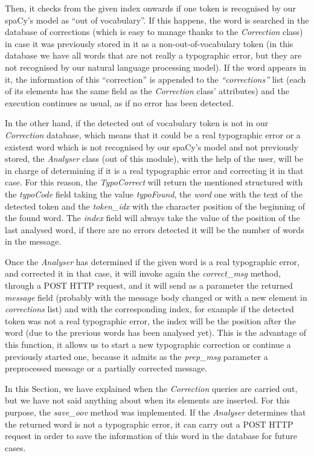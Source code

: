 Then, it checks from the given index onwards if one token is recognised by our spaCy's model as ``out of vocabulary''. If this happens, the word is searched in the database of corrections (which is easy to manage thanks to the \textit{Correction} class) in case it was previously stored in it as a non-out-of-vocabulary token (in this database we have all words that are not really a typographic error, but they are not recognised by our natural language processing model). If the word appears in it, the information of this ``correction'' is appended to the \textit{``corrections''} list (each of its elements has the same field as the \textit{Correction} class' attributes) and the execution continues as usual, as if no error has been detected.

In the other hand, if the detected out of vocabulary token is not in our \textit{Correction} database, which means that it could be a real typographic error or a existent word which is not recognised by our spaCy's model and not previously stored, the \textit{Analyser} class (out of this module), with the help of the user, will be in charge of determining if it is a real typographic error and correcting it in that case. For this reason, the \textit{TypoCorrect} will return the mentioned structured with the \textit{typoCode} field taking the value \textit{typoFound}, the \textit{word} one with the text of the detected token and the \textit{token\_idx} with the character position of the beginning of the found word. The \textit{index} field will always take the value of the position of the last analysed word, if there are no errors detected it will be the number of words in the message.

Once the \textit{Analyser} has determined if the given word is a real typographic error, and corrected it in that case, it will invoke again the \textit{correct\_msg} method, through a POST HTTP request, and it will send as a parameter the returned \textit{message} field (probably with the message body changed or with a new element in \textit{corrections} list) and with the corresponding index, for example if the detected token was not a real typographic error, the index will be the position after the word (due to the previous words has been analysed yet). This is the advantage of this function, it allows us to start a new typographic correction or continue a previously started one, because it admits as the \textit{prep\_msg} parameter a preprocessed message or a partially corrected message.

In this Section, we have explained when the \textit{Correction} queries are carried out, but we have not said anything about when its elements are inserted. For this purpose, the \textit{save\_oov} method was implemented. If the \textit{Analyser} determines that the returned word is not a typographic error, it can carry out a POST HTTP request in order to save the information of this word in the database for future cases.